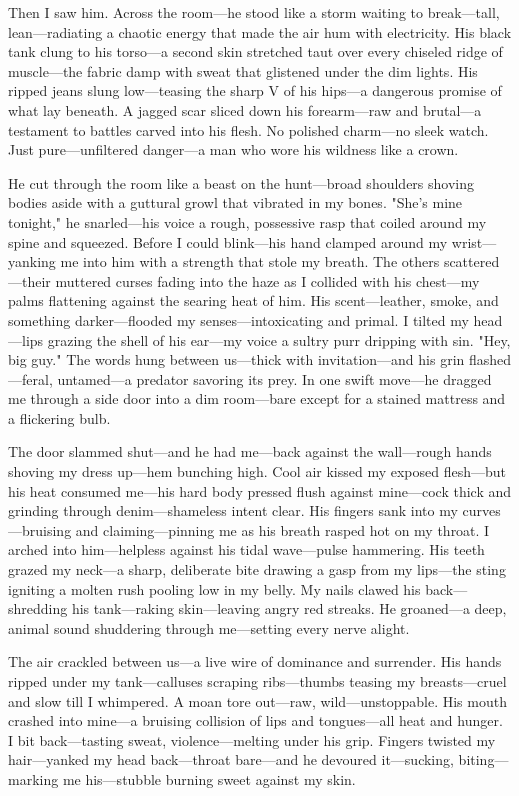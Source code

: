 \documentclass{article}
\begin{document}
Then I saw him. Across the room—he stood like a storm waiting to break—tall, lean—radiating a chaotic energy that made the air hum with electricity. His black tank clung to his torso—a second skin stretched taut over every chiseled ridge of muscle—the fabric damp with sweat that glistened under the dim lights. His ripped jeans slung low—teasing the sharp V of his hips—a dangerous promise of what lay beneath. A jagged scar sliced down his forearm—raw and brutal—a testament to battles carved into his flesh. No polished charm—no sleek watch. Just pure—unfiltered danger—a man who wore his wildness like a crown.

He cut through the room like a beast on the hunt—broad shoulders shoving bodies aside with a guttural growl that vibrated in my bones. "She’s mine tonight," he snarled—his voice a rough, possessive rasp that coiled around my spine and squeezed. Before I could blink—his hand clamped around my wrist—yanking me into him with a strength that stole my breath. The others scattered—their muttered curses fading into the haze as I collided with his chest—my palms flattening against the searing heat of him. His scent—leather, smoke, and something darker—flooded my senses—intoxicating and primal. I tilted my head—lips grazing the shell of his ear—my voice a sultry purr dripping with sin. "Hey, big guy." The words hung between us—thick with invitation—and his grin flashed—feral, untamed—a predator savoring its prey. In one swift move—he dragged me through a side door into a dim room—bare except for a stained mattress and a flickering bulb.

The door slammed shut—and he had me—back against the wall—rough hands shoving my dress up—hem bunching high. Cool air kissed my exposed flesh—but his heat consumed me—his hard body pressed flush against mine—cock thick and grinding through denim—shameless intent clear. His fingers sank into my curves—bruising and claiming—pinning me as his breath rasped hot on my throat. I arched into him—helpless against his tidal wave—pulse hammering. His teeth grazed my neck—a sharp, deliberate bite drawing a gasp from my lips—the sting igniting a molten rush pooling low in my belly. My nails clawed his back—shredding his tank—raking skin—leaving angry red streaks. He groaned—a deep, animal sound shuddering through me—setting every nerve alight.

The air crackled between us—a live wire of dominance and surrender. His hands ripped under my tank—calluses scraping ribs—thumbs teasing my breasts—cruel and slow till I whimpered. A moan tore out—raw, wild—unstoppable. His mouth crashed into mine—a bruising collision of lips and tongues—all heat and hunger. I bit back—tasting sweat, violence—melting under his grip. Fingers twisted my hair—yanked my head back—throat bare—and he devoured it—sucking, biting—marking me his—stubble burning sweet against my skin.
\end{document}
